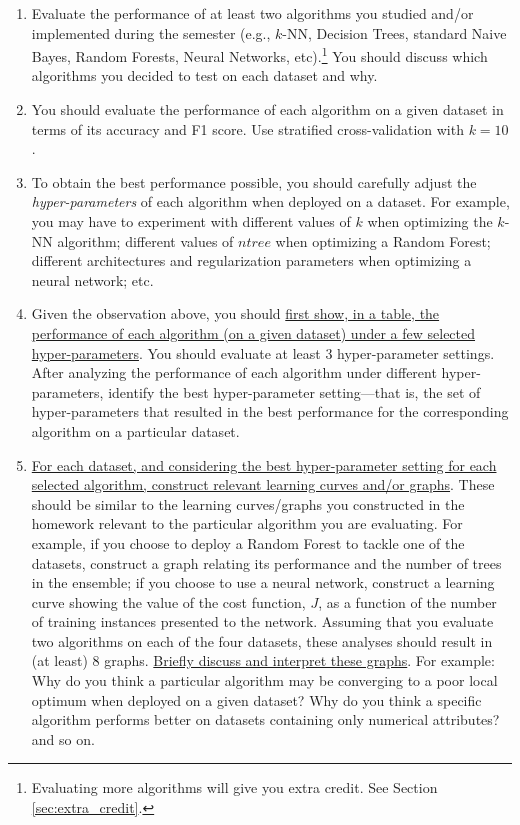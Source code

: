 \documentclass[letterpaper]{article}
\begin{document}
\begin{enumerate}
	\item Evaluate the performance of \textcolor{dark-red}{at least two algorithms} you studied and/or implemented during the semester (e.g., $k$-NN, Decision Trees, standard Naive Bayes, Random Forests, Neural Networks, etc).\footnote{Evaluating more algorithms will give you extra credit. See Section \ref{sec:extra_credit}.} You should discuss which algorithms you decided to test on each dataset and why.
	\item You should evaluate the performance of each algorithm on a given dataset in terms of its accuracy and F1 score. Use stratified cross-validation with $k=10$.
	\item To obtain the best performance possible, you should carefully adjust the \textit{hyper-parameters} of each algorithm when deployed on a dataset. For example, you may have to experiment with different values of $k$ when optimizing the $k$-NN algorithm; different values of $ntree$ when optimizing a Random Forest; different architectures and regularization parameters when optimizing a neural network; etc.
	\item Given the observation above, you should \ul{first show, in a table, the performance of each algorithm (on a given dataset) under a few selected hyper-parameters}. You should evaluate at least 3 hyper-parameter settings. After analyzing the performance of each algorithm under different hyper-parameters, identify the best hyper-parameter setting---that is, the set of hyper-parameters that resulted in the best performance for the corresponding algorithm on a particular dataset.
	\item \ul{For each dataset, and considering the best hyper-parameter setting for each selected algorithm, construct relevant learning curves and/or graphs}. These should be similar to the learning curves/graphs you constructed in the homework relevant to the particular algorithm you are evaluating. For example, if you choose to deploy a Random Forest to tackle one of the datasets, construct a graph relating its performance and the number of trees in the ensemble; if you choose to use a neural network, construct a learning curve showing the value of the cost function, $J$, as a function of the number of training instances presented to the network. Assuming that you evaluate two algorithms on each of the four datasets, these analyses should result in (at least) 8 graphs. \ul{Briefly discuss and interpret these graphs}. For example: Why do you think a particular algorithm may be converging to a poor local optimum when deployed on a given dataset? Why do you think a specific algorithm performs better on datasets containing only numerical attributes? and so on.
\end{enumerate}
\end{document}
